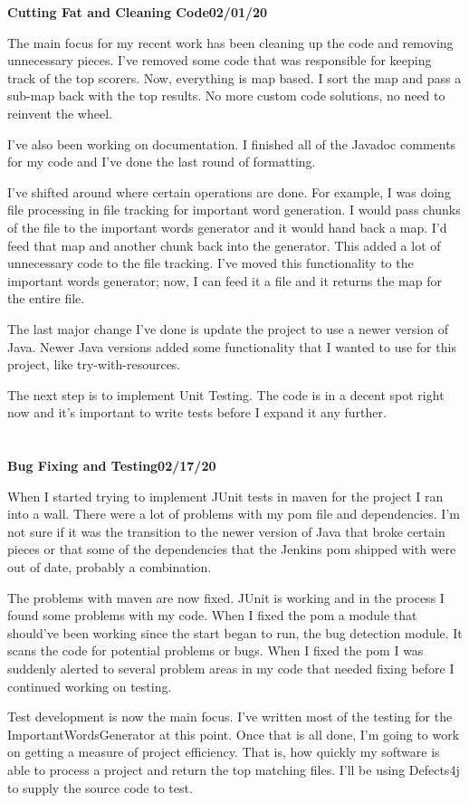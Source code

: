 \documentclass[]{article}
\newenvironment{logentry}[2]%
{\noindent\vspace{.2cm}\large\textbf{#2}\titlerule\large\textbf{#1}}
{\\\\\\}
\begin{document}
\begin{logentry}{02/01/20}{Cutting Fat and Cleaning Code}
    \par The main focus for my recent work has been cleaning up the 
    code and removing unnecessary pieces.  I've removed some code that was
    responsible for keeping track of the top scorers.  Now, everything is map
    based.  I sort the map and pass a sub-map back with the top results.
    No more custom code solutions, no need to reinvent the wheel.
    \par I've also been working on documentation.  I finished
    all of the Javadoc comments for my code and I've done
    the last round of formatting.
    \par I've shifted around where certain operations are done.
    For example, I was doing file processing in file tracking for important
    word generation.  I would pass chunks of the file to the
    important words generator and it would hand back a map.
    I'd feed that map and another chunk back into the generator.
    This added a lot of unnecessary code to the file tracking.
    I've moved this functionality to the important words generator;
    now, I can feed it a file and it returns the map for the entire file.
    \par The last major change I've done is update the project to use
    a newer version of Java.  Newer Java versions added some functionality
    that I wanted to use for this project, like try-with-resources.
    \par The next step is to implement Unit Testing.  The code is in a 
    decent spot right now and it's important to write tests before
    I expand it any further.
\end{logentry}
\begin{logentry}{02/17/20}{Bug Fixing and Testing}
    \par When I started trying to implement JUnit tests in maven for the project
    I ran into a wall.  There were a lot of problems with my pom file and
    dependencies.  I'm not sure if it was the transition to the newer version
    of Java that broke certain pieces or that some of the dependencies
    that the Jenkins pom shipped with were out of date, probably
    a combination.  
    \par The problems with maven are now fixed.  JUnit is working and
    in the process I found some problems with my code.  When I fixed
    the pom a module that should've been working since the start 
    began to run, the bug detection module.  It scans the code for 
    potential problems or bugs.  When I fixed the pom I was suddenly 
    alerted to several problem areas in my code that needed fixing
    before I continued working on testing.
    \par Test development is now the main focus.  I've written
    most of the testing for the ImportantWordsGenerator at this point.
    Once that is all done, I'm going to work on getting a measure of 
    project efficiency.  That is, how quickly my software is able
    to process a project and return the top matching files.
    I'll be using Defects4j to supply the source code to test.
\end{logentry}
\end{document}
